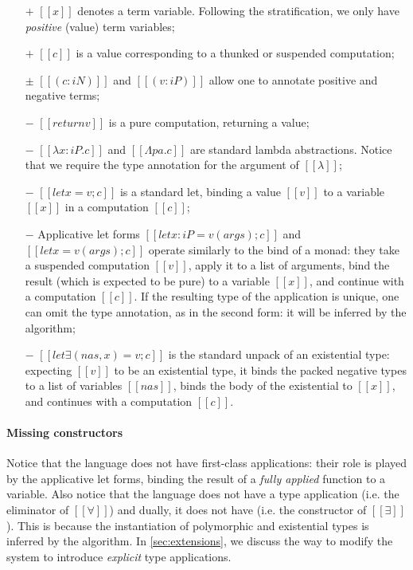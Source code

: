 \begin{itemize}
    \item [$+$] $[[x]]$ denotes a term variable.
      Following the \CBPV stratification, we only have \emph{positive} (value)
      term variables;
    \item [$+$] $[[{c}]]$ is a value corresponding to a thunked 
        or suspended computation;
    \item [$\pm$] $[[(c : iN)]]$ and $[[(v : iP)]]$ allow one to annotate 
        positive and negative terms;
    \item [$-$] $[[return v]]$ is a pure computation, returning a value;
    \item [$-$] $[[λ x : iP . c]]$ and $[[Λ pa . c]]$
        are standard lambda abstractions. Notice that we require
        the type annotation for the argument of $[[λ]]$;
    \item [$-$] $[[ let x = v ; c]]$ is a standard let, binding
        a value $[[v]]$ to a variable $[[x]]$ in a computation $[[c]]$;
    \item [$-$] Applicative let forms $[[let x : iP = v ( args ) ; c]]$ and
        $[[let x = v ( args ) ; c]]$ operate similarly to 
        the bind of a monad: they take a suspended computation $[[v]]$,
        apply it to a list of arguments, bind the result 
        (which is expected to be pure) to a variable $[[x]]$,
        and continue with a computation $[[c]]$.
        If the resulting type of the application is unique, 
        one can omit the type annotation, as in the second form:
        it will be inferred by the algorithm;
    \item [$-$] $[[let∃ ( nas , x ) = v ; c]]$
        is the standard unpack of an existential type:
        expecting $[[v]]$ to be an existential type,
        it binds the packed negative types to a list of 
        variables $[[nas]]$, binds the body of the existential
        to $[[x]]$, and continues with a computation $[[c]]$.
\end{itemize}

\paragraph{Missing constructors}
Notice that the language does not have first-class applications: 
their role is played by the applicative let forms, binding 
the result of a \emph{fully applied} function to a variable.
Also notice that the language does not have a type application (i.e. the eliminator of $[[∀]]$) and dually, it does not have \pack (i.e. the constructor of $[[∃]]$).
This is because the instantiation of polymorphic and existential types is inferred by the algorithm. 
In \cref{sec:extensions}, we discuss the way to modify the system to introduce \emph{explicit} type applications.


